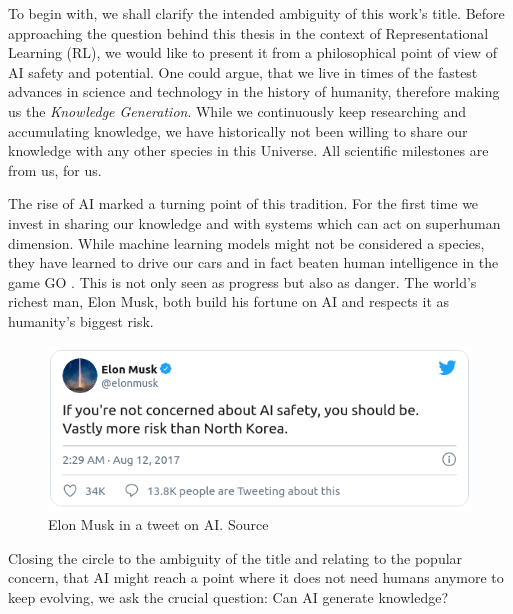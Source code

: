 

To begin with, we shall clarify the intended ambiguity of this work's title. Before approaching the question behind this thesis in the context of Representational Learning (RL), we would like to present it from a philosophical point of view of AI safety and potential.
One could argue, that we live in times of the fastest advances in science and technology in the history of humanity, therefore making us the \textit{Knowledge Generation}. While we continuously keep researching and accumulating knowledge, we have historically not been willing to share our knowledge with any other species in this Universe. All scientific milestones are from us, for us. 

The rise of AI marked a turning point of this tradition. For the first time we invest in sharing our knowledge and with systems which can act on superhuman dimension. While machine learning models might not be considered a species, they have learned to drive our cars and in fact beaten human intelligence in the game GO \cite{silver_mastering_2017}. This is not only seen as progress but also as danger. The world's richest man, Elon Musk, both build his fortune on AI and respects it as humanity's biggest risk. 

\begin{figure}[H]
    \centering
    \includegraphics[height=.21\textwidth, keepaspectratio]{data/images/ElonMusk.png}
    \caption{Elon Musk in a tweet on AI. Source \cite{noauthor_elon_nodate}}
    \label{fig1:Elon}
\end{figure}


%     


Closing the circle to the ambiguity of the title and relating to the popular concern, that AI might reach a point where it does not need humans anymore to keep evolving, we ask the crucial question: Can AI generate knowledge? 


